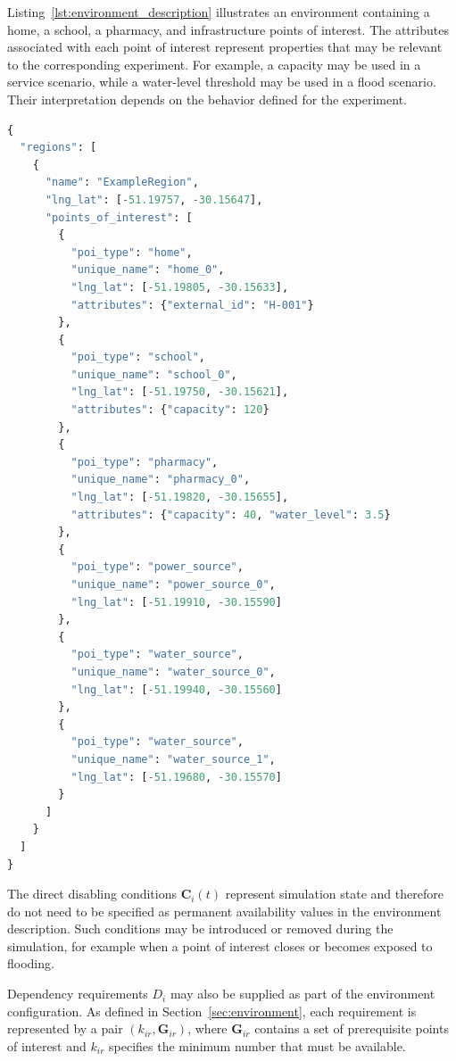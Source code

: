 Listing~\ref{lst:environment_description} illustrates an environment containing a home, a school, a pharmacy, and infrastructure points of interest. The attributes associated with each point of interest represent properties that may be relevant to the corresponding experiment. For example, a capacity may be used in a service scenario, while a water-level threshold may be used in a flood scenario. Their interpretation depends on the behavior defined for the experiment.

\begin{lstlisting}[language={Python},
caption={Example of an environment input file with typed POIs and attributes.},
captionpos=b, label={lst:environment_description}, basicstyle=\scriptsize]
{
  "regions": [
    {
      "name": "ExampleRegion",
      "lng_lat": [-51.19757, -30.15647],
      "points_of_interest": [
        {
          "poi_type": "home",
          "unique_name": "home_0",
          "lng_lat": [-51.19805, -30.15633],
          "attributes": {"external_id": "H-001"}
        },
        {
          "poi_type": "school",
          "unique_name": "school_0",
          "lng_lat": [-51.19750, -30.15621],
          "attributes": {"capacity": 120}
        },
        {
          "poi_type": "pharmacy",
          "unique_name": "pharmacy_0",
          "lng_lat": [-51.19820, -30.15655],
          "attributes": {"capacity": 40, "water_level": 3.5}
        },
        {
          "poi_type": "power_source",
          "unique_name": "power_source_0",
          "lng_lat": [-51.19910, -30.15590]
        },
        {
          "poi_type": "water_source",
          "unique_name": "water_source_0",
          "lng_lat": [-51.19940, -30.15560]
        },
        {
          "poi_type": "water_source",
          "unique_name": "water_source_1",
          "lng_lat": [-51.19680, -30.15570]
        }
      ]
    }
  ]
}
\end{lstlisting}

The direct disabling conditions $\bm{C}_i(t)$ represent simulation state and therefore do not need to be specified as permanent availability values in the environment description. Such conditions may be introduced or removed during the simulation, for example when a point of interest closes or becomes exposed to flooding.

Dependency requirements $D_i$ may also be supplied as part of the environment configuration. As defined in Section~\ref{sec:environment}, each requirement is represented by a pair $(k_{ir},\bm{G}_{ir})$, where $\bm{G}_{ir}$ contains a set of prerequisite points of interest and $k_{ir}$ specifies the minimum number that must be available.

